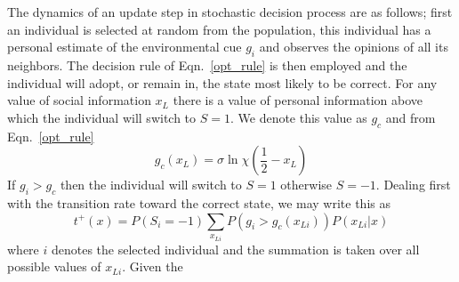 \documentclass[aps,prl,twocolumn,showpacs,superscriptaddress,groupedaddress]{revtex4}
\begin{document}
The dynamics of an update step in stochastic decision process are as follows; first an individual is selected at random from the population, this individual has a personal estimate of the environmental cue $g_i$ and observes the opinions of all its neighbors. The decision rule of Eqn.~\ref{opt_rule} is then employed and the individual will adopt, or remain in, the state most likely to be correct.
For any value of social information $x_L$ there is a value of personal information above which the individual will switch to $S=1$. We denote this value as $g_c$ and from Eqn.~\ref{opt_rule} 
\begin{equation}
g_c(x_L) = \sigma\ln\chi  \left(\frac{1}{2}-x_L\right) 
\end{equation}
If $g_i>g_c$ then the individual will switch to $S=1$ otherwise $S=-1$. 
Dealing first with the transition rate toward the correct state, we may write this as
\begin{equation}
t^+(x) = P(S_i=-1)\sum_{x_{Li}}P\left(g_i>g_c(x_{Li})\right)P\left(x_{Li}|x\right)
\end{equation}
where $i$ denotes the selected individual and the summation is taken over all possible values of $x_{Li}$.
Given the 



%
%
%

\end{document}

